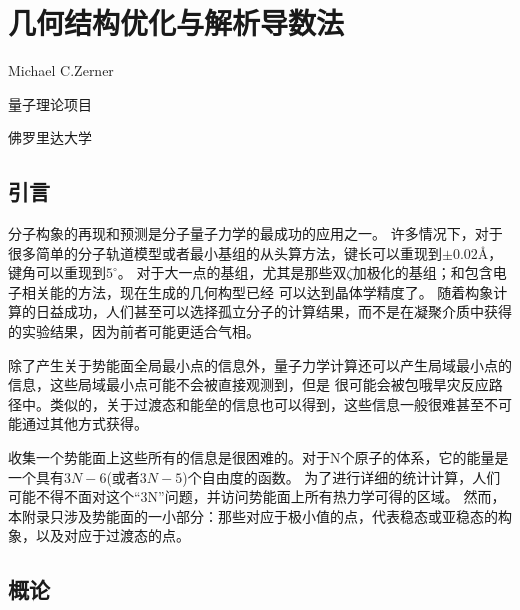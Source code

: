 \chapter{几何结构优化与解析导数法}

Michael C.Zerner

量子理论项目

佛罗里达大学

\section{引言}

分子构象的再现和预测是分子量子力学的最成功的应用之一。
许多情况下，对于很多简单的分子轨道模型或者最小基组的从头算方法，键长可以重现到$\pm 0.02$\r A，
键角可以重现到$5^{\circ}$。
对于大一点的基组，尤其是那些双$\zeta$加极化的基组；和包含电子相关能的方法，现在生成的几何构型已经
可以达到晶体学精度了。
随着构象计算的日益成功，人们甚至可以选择孤立分子的计算结果，而不是在凝聚介质中获得的实验结果，因为前者可能更适合气相。

除了产生关于势能面全局最小点的信息外，量子力学计算还可以产生局域最小点的信息，这些局域最小点可能不会被直接观测到，但是
很可能会被包哦旱灾反应路径中。类似的，关于过渡态和能垒的信息也可以得到，这些信息一般很难甚至不可能通过其他方式获得。

收集一个势能面上这些所有的信息是很困难的。对于N个原子的体系，它的能量是一个具有$3N-6$(或者$3N-5$)个自由度的函数。
为了进行详细的统计计算，人们可能不得不面对这个“3N”问题，并访问势能面上所有热力学可得的区域。
然而，本附录只涉及势能面的一小部分：那些对应于极小值的点，代表稳态或亚稳态的构象，以及对应于过渡态的点。
\section{概论}

